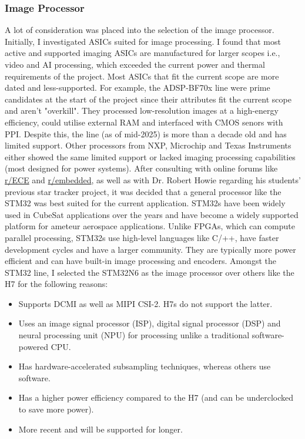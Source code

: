 \documentclass[10pt]{article}
\newcommand{\nl}{\newline \newline}
\begin{document}
\subsubsection{Image Processor} \label{sec:image-processor}
A lot of consideration was placed into the selection of the image processor. Initially, I investigated ASICs suited for image processing. I found that most active and supported imaging ASICs are manufactured for larger scopes i.e., video and AI processing, which exceeded the current power and thermal requirements of the project.
Most ASICs that fit the current scope are more dated and less-supported. For example, the ADSP-BF70x line were prime candidates at the start of the project since their attributes fit the current scope and aren't "overkill". They processed low-resolution images at a high-energy efficiency, could utilise external RAM and interfaced with CMOS senors with PPI.
Despite this, the line (as of mid-2025) is more than a decade old and has limited support. Other processors from NXP, Microchip and Texas Instruments either showed the same limited support or lacked imaging processing capabilities (most designed for power systems).
After consulting with online forums like \href{https://www.reddit.com/r/ECE/comments/1mizdoo/best_asic_for_image_processing/}{r/ECE} and \href{https://www.reddit.com/r/embedded/comments/1mfv3zn/comment/n6kd7jb/}{r/embedded}, as well as with Dr. Robert Howie regarding his students' previous star tracker project, it was decided that a general processor like the STM32 was best suited for the current application.
\nl
STM32s have been widely used in CubeSat applications over the years and have become a widely supported platform for ameteur aerospace applications. Unlike FPGAs, which can compute parallel processing, STM32s use high-level languages like C/++, have faster development cycles and have a larger community. They are typically more power efficient and can have built-in image processing and encoders.
Amongst the STM32 line, I selected the STM32N6 as the image processor over others like the H7 for the following reasons:
\begin{itemize}
    \item Supports DCMI as well as MIPI CSI-2. H7s do not support the latter.
    \item Uses an image signal processor (ISP), digital signal processor (DSP) and neural processing unit (NPU) for processing unlike a traditional software-powered CPU.
    \item Has hardware-accelerated subsampling techniques, whereas others use software.
    \item Has a higher power efficiency compared to the H7 (and can be underclocked to save more power).
    \item More recent and will be supported for longer.
\end{itemize}
\end{document}
